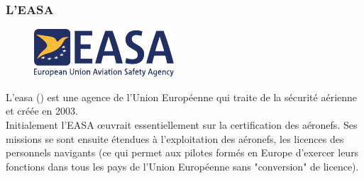 		
		\subsubsection{L'EASA}
		
		\begin{figure}
		\includegraphics[width=0.9\linewidth]{02-Navigation/img/EASA-logo.pdf} 
		\end{figure}
		
		L'\acrshort{easa} () est une agence de l'Union Européenne qui traite de la sécurité aérienne et créée en 2003. \\
		
		Initialement l'EASA œuvrait essentiellement sur la certification des aéronefs. Ses missions se sont ensuite étendues à l'exploitation des aéronefs, les licences des personnels navigants (ce qui permet aux pilotes formés en Europe d'exercer leurs fonctions dans tous les pays de l'Union Européenne sans "conversion" de licence).
		
